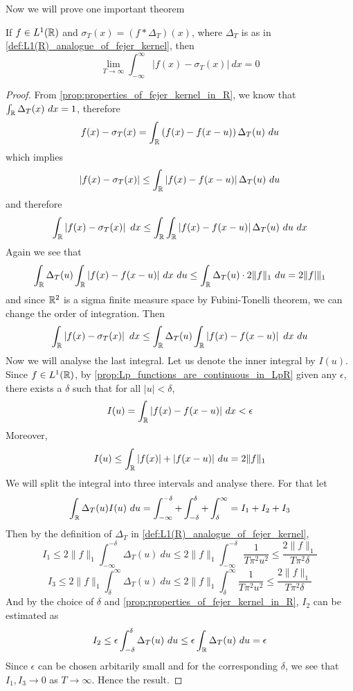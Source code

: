 Now we will prove one important theorem
\begin{theorem}
  \label{thm:almost_fourier_inversion}
  If $f\in L^1(\mathbb R)$ and $\sigma_T(x) = (f*\Delta_T)(x)$, where $\Delta_T$ is as in \autoref{def:L1(R)_analogue_of_fejer_kernel}, then $$\lim_{T\to \infty} \int_{-\infty}^{\infty}|f(x) - \sigma_T(x)| \ dx = 0$$
\end{theorem}
\begin{proof}
  From \autoref{prop:properties_of_fejer_kernel_in_R}, we know that $\int_\mathbb R \Delta_T(x) \ dx = 1$, therefore $$f(x) - \sigma_T(x) = \int_\mathbb R \left(f(x) - f(x-u)\right) \Delta_T(u) \ du$$
  which implies $$\left|f(x)-\sigma_T(x)\right| \le \int_\mathbb R \left|f(x) - f(x-u)\right| \Delta_T(u) \ du$$
  and therefore $$\int_\mathbb R \left|f(x)-\sigma_T(x)\right| \ dx \le \int_\mathbb R \int_\mathbb R \left|f(x) - f(x-u)\right| \Delta_T(u) \ du \ dx$$
  Again we see that $$\int_\mathbb R \Delta_T(u) \int_\mathbb R |f(x) - f(x-u)| \ dx \ du \le \int_\mathbb R \Delta_T(u) \cdot 2\|f\|_1 \ du = 2\|f|\|_1$$
  and since $\mathbb R^2$ is a sigma finite measure space by Fubini-Tonelli theorem, we can change the order of integration. Then $$\int_\mathbb R \left|f(x)-\sigma_T(x)\right| \ dx \le \int_\mathbb R \Delta_T(u) \int_\mathbb R \left|f(x) - f(x-u)\right|  \ dx \ du$$
  Now we will analyse the last integral. Let us denote the inner integral by $I(u)$. Since $f\in L^1(\mathbb R)$, by \autoref{prop:Lp_functions_are_continuous_in_LpR} given any $\epsilon$, there exists a $\delta$ such that for all $|u| < \delta$, $$I(u) = \int_\mathbb R |f(x) - f(x-u)| \ dx < \epsilon$$
  Moreover, $$I(u) \le \int_\mathbb R |f(x)| + |f(x-u)| \ du = 2\|f\|_1$$
  We will split the integral into three intervals and analyse there. For that let $$\int_\mathbb R \Delta_T(u) I(u) \ du = \int_{-\infty}^{-\delta}+ \int_{-\delta}^{\delta} + \int^{\infty}_{\delta} = I_1 + I_2 + I_3$$
  Then by the definition of $\Delta_T$ in \autoref{def:L1(R)_analogue_of_fejer_kernel},
  $$I_1 \le 2\|f\|_1 \int_{-\infty}^{-\delta} \Delta_T(u) \ du \le 2\|f\|_1\int_{-\infty}^{-\delta} \frac{1}{T\pi^2 u^2} \le \frac{2\|f\|_1}{T\pi^2 \delta}$$ $$I_3 \le 2\|f\|_1 \int^{\infty}_{\delta} \Delta_T(u) \ du \le 2\|f\|_1\int^{\infty}_{\delta} \frac{1}{T\pi^2 u^2} \le \frac{2\|f\|_1}{T\pi^2 \delta}$$
  And by the choice of $\delta$ and \autoref{prop:properties_of_fejer_kernel_in_R}, $I_2$ can be estimated as $$I_2 \le \epsilon \int_{-\delta}^\delta \Delta_T(u) \ du \le \epsilon \int_\mathbb R \Delta_T(u) \ du = \epsilon$$
  Since $\epsilon$ can be chosen arbitarily small and for the corresponding $\delta$, we see that $I_1, I_3 \to 0$ as $T\to \infty$. Hence the result.
\end{proof}

